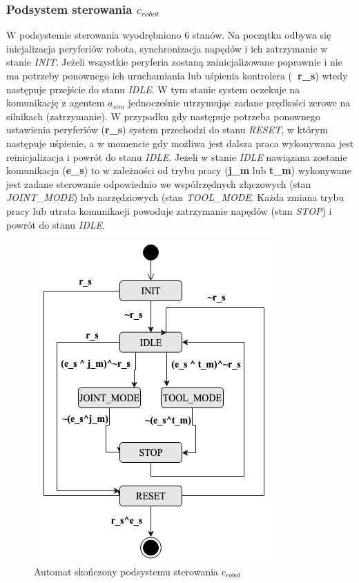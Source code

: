 \documentclass[a4paper, 12pt, twoside]{article}
\begin{document}
\subsubsection{Podsystem sterowania $c_{robot}$}
W podsystemie sterowania wyodrębniono 6 stanów. Na początku odbywa się inicjalizacja peryferiów robota, synchronizacja napędów i ich zatrzymanie w stanie \textit{INIT}. Jeżeli wszystkie peryferia zostaną zainicjalizowane poprawnie i nie ma potrzeby ponownego ich uruchamiania lub uśpienia kontrolera (\textbf{~r\_s}) wtedy następuje przejście do stanu \textit{IDLE}. W tym stanie system oczekuje na komunikację z agentem $a_{sim}$ jednocześnie utrzymując zadane prędkości zerowe na silnikach (zatrzymanie). W przypadku gdy następuje potrzeba ponownego ustawienia peryferiów (\textbf{r\_s}) system przechodzi do stanu \textit{RESET}, w którym następuje uśpienie, a w momencie gdy możliwa jest dalsza praca wykonywana jest reinicjalizacja i powrót do stanu \textit{IDLE}. Jeżeli w stanie \textit{IDLE} nawiązana zostanie komunikacja (\textbf{e\_s}) to w zależności od trybu pracy (\textbf{j\_m} lub \textbf{t\_m}) wykonywane jest zadane sterowanie odpowiednio we współrzędnych złączowych (stan \textit{JOINT\_MODE}) lub narzędziowych (stan \textit{TOOL\_MODE}. Każda zmiana trybu pracy lub utrata komunikacji powoduje zatrzymanie napędów (stan \textit{STOP}) i powrót do stanu \textit{IDLE}.

\begin{figure}[hbt!]
\centering
\includegraphics[width=0.6\linewidth]{images/state_robot.png}
\caption{Automat skończony podsystemu sterowania $c_{robot}$ }
\label{fig:state_robot}
\end{figure}
\end{document}
